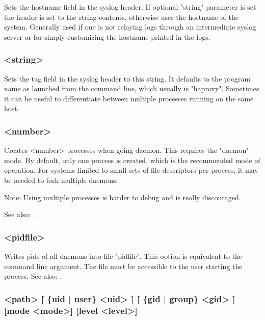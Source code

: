 Sets the hostname field in the syslog header. If optional "string" parameter
is set the header is set to the string contents, otherwise uses the hostname
of the system. Generally used if one is not relaying logs through an
intermediate syslog server or for simply customizing the hostname printed in
the logs.

\subsubsection[log-tag]{ <string>}

Sets the tag field in the syslog header to this string. It defaults to the
program name as launched from the command line, which usually is "haproxy".
Sometimes it can be useful to differentiate between multiple processes
running on the same host.

\subsubsection[nbproc]{ <number>}

Creates <number> processes when going daemon. This requires the "daemon"
mode. By default, only one process is created, which is the recommended mode
of operation. For systems limited to small sets of file descriptors per
process, it may be needed to fork multiple daemons.

\begin{note}{Note:}
Using multiple processes
is harder to debug and is really discouraged.
\end{note}

See also: .

\subsubsection[pidfile]{ <pidfile>}

  Writes pids of all daemons into file "pidfile". This option is equivalent to
  the  command line argument. The file must be accessible to the user
  starting the process. See also: .

\subsubsection[stats socket]{ <path> [ \{uid | user\} <uid> ] [ \{gid | group\} <gid> ] [mode <mode>] [level <level>]}

